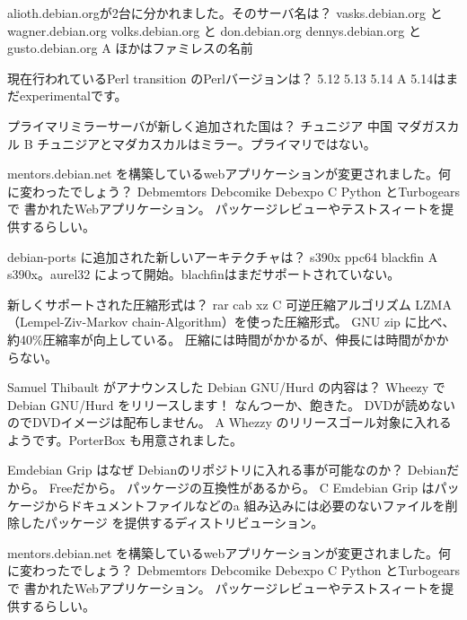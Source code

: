 %

\santaku
{alioth.debian.orgが2台に分かれました。そのサーバ名は？}
{vasks.debian.org と wagner.debian.org}
{volks.debian.org と don.debian.org}
{dennys.debian.org と gusto.debian.org}
{A}
{ほかはファミレスの名前}

\santaku
{現在行われているPerl transition のPerlバージョンは？}
{5.12}
{5.13}
{5.14}
{A}
{5.14はまだexperimentalです。}

\santaku
{プライマリミラーサーバが新しく追加された国は？}
{チュニジア}
{中国}
{マダガスカル}
{B}
{チュニジアとマダカスカルはミラー。プライマリではない。}

\santaku
{mentors.debian.net を構築しているwebアプリケーションが変更されました。何に変わったでしょう？}
{Debmemtors}
{Debcomike}
{Debexpo}
{C}
{Python とTurbogears で
書かれたWebアプリケーション。
パッケージレビューやテストスィートを提供するらしい。}

\santaku
{debian-ports に追加された新しいアーキテクチャは？}
{s390x}
{ppc64}
{blackfin}
{A}
{s390x。aurel32 によって開始。blachfinはまだサポートされていない。}

\santaku
{新しくサポートされた圧縮形式は？}
{rar}
{cab}
{xz}
{C}
{可逆圧縮アルゴリズム LZMA
（Lempel-Ziv-Markov chain-Algorithm）を使った圧縮形式。
GNU zip に比べ、
約40\%圧縮率が向上している。
圧縮には時間がかかるが、伸長には時間がかからない。
}

\santaku
{Samuel Thibault がアナウンスした Debian GNU/Hurd の内容は？}
{Wheezy で Debian GNU/Hurd をリリースします！}
{なんつーか、飽きた。}
{DVDが読めないのでDVDイメージは配布しません。}
{A}
{Whezzy のリリースゴール対象に入れるようです。PorterBox も用意されました。}

\santaku
{Emdebian Grip はなぜ Debianのリポジトリに入れる事が可能なのか？}
{Debianだから。}
{Freeだから。}
{パッケージの互換性があるから。}
{C}
{Emdebian Grip はパッケージからドキュメントファイルなどのa 
組み込みには必要のないファイルを削除したパッケージ
を提供するディストリビューション。}

\santaku
{mentors.debian.net を構築しているwebアプリケーションが変更されました。何に変わったでしょう？}
{Debmemtors}
{Debcomike}
{Debexpo}
{C}
{Python とTurbogears で
書かれたWebアプリケーション。
パッケージレビューやテストスィートを提供するらしい。}

